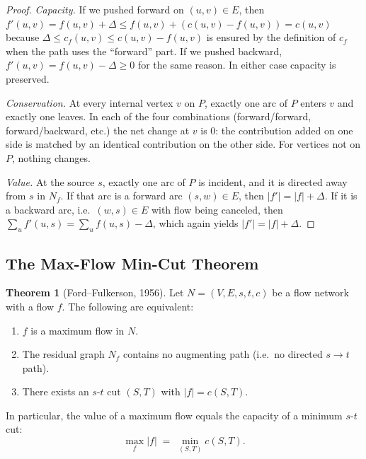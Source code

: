 \documentclass{article}
\theoremstyle{definition}
\newtheorem{theorem}{Theorem}
\begin{document}
\begin{proof}
\emph{Capacity.} If we pushed forward on $(u, v) \in E$, then
$f'(u, v) = f(u, v) + \Delta \le f(u, v) + (c(u, v) - f(u, v)) = c(u, v)$
because $\Delta \le c_f(u, v) \le c(u, v) - f(u, v)$ is ensured by
the definition of $c_f$ when the path uses the ``forward'' part. If
we pushed backward, $f'(u, v) = f(u, v) - \Delta \ge 0$ for the same
reason. In either case capacity is preserved.

\emph{Conservation.} At every internal vertex $v$ on $P$, exactly one
arc of $P$ enters $v$ and exactly one leaves. In each of the four
combinations (forward/forward, forward/backward, etc.) the net change
at $v$ is $0$: the contribution added on one side is matched by an
identical contribution on the other side. For vertices not on $P$,
nothing changes.

\emph{Value.} At the source $s$, exactly one arc of $P$ is incident,
and it is directed away from $s$ in $N_f$. If that arc is a forward
arc $(s, w) \in E$, then $|f'| = |f| + \Delta$. If it is a backward
arc, i.e.\ $(w, s) \in E$ with flow being canceled, then
$\sum_u f'(u, s) = \sum_u f(u, s) - \Delta$, which again yields
$|f'| = |f| + \Delta$.
\end{proof}

\subsection{The Max-Flow Min-Cut Theorem}

\begin{theorem}[Ford--Fulkerson, 1956]\label{thm:mfmc}
Let $N = (V, E, s, t, c)$ be a flow network with a flow $f$. The
following are equivalent:
\begin{enumerate}
  \item $f$ is a maximum flow in $N$.
  \item The residual graph $N_f$ contains no augmenting path
        (i.e.\ no directed $s \to t$ path).
  \item There exists an $s$-$t$ cut $(S, T)$ with
        $|f| = c(S, T)$.
\end{enumerate}
In particular, the value of a maximum flow equals the capacity of a
minimum $s$-$t$ cut:
\[
  \max_{f} |f| \;=\; \min_{(S, T)} c(S, T).
\]
\end{theorem}
\end{document}
